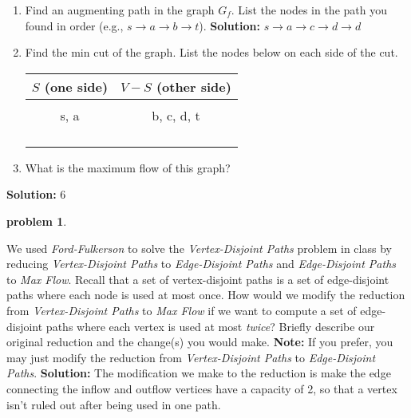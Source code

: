 \documentclass[10pt]{article}
\newcommand{\solution}[1]{\color{blue}\hfill\break\noindent\textbf{Solution:} #1\color{black}}
\newtheorem{problem}{\sc\color{cit}problem}
\begin{document}
\begin{enumerate}
    \item Find an augmenting path in the graph $G_f$.  List the nodes in the path you found in order (e.g., $s \rightarrow a \rightarrow b \rightarrow t$).
    \solution{
    $s \rightarrow a \rightarrow c \rightarrow d \rightarrow d$
    }
    
    \item Find the min cut of the graph.  List the nodes below on each side of the cut.
\begin{center}
\begin{tabular}{|c|c|}
     \hline
    \textbf{$S$ (one side)} & \textbf{$V-S$ (other side)}\\
     \hline \hline
     \hspace{2.5in} & \hspace{2.5in} \\
      s, a&b, c, d, t \\
      & \\
      & \\
      & \\
      & \\
     \hline
\end{tabular}
\end{center}

\item What is the maximum flow of this graph?
\end{enumerate}

\solution{
6
}
  
 
\begin{problem}\end{problem}
We used \emph{Ford-Fulkerson} to solve the \emph{Vertex-Disjoint Paths} problem in class by reducing
\emph{Vertex-Disjoint Paths} to \emph{Edge-Disjoint Paths} and 
\emph{Edge-Disjoint Paths} to \emph{Max Flow}. Recall that a set of vertex-disjoint paths is
a set of edge-disjoint paths where each node is used at most once. How would we modify the reduction from \emph{Vertex-Disjoint Paths} to \emph{Max Flow} if we want to compute a set of edge-disjoint paths where each vertex is used at most {\em twice}? Briefly describe our original reduction and the change(s) you would make. {\bf Note:} If you prefer, you may just modify the reduction from \emph{Vertex-Disjoint Paths} to \emph{Edge-Disjoint Paths}.
\solution{
    The modification we make to the reduction is make the edge connecting the inflow and outflow vertices have a capacity of 2, so that a vertex isn't ruled out after being used in one path.
}
\end{document}
